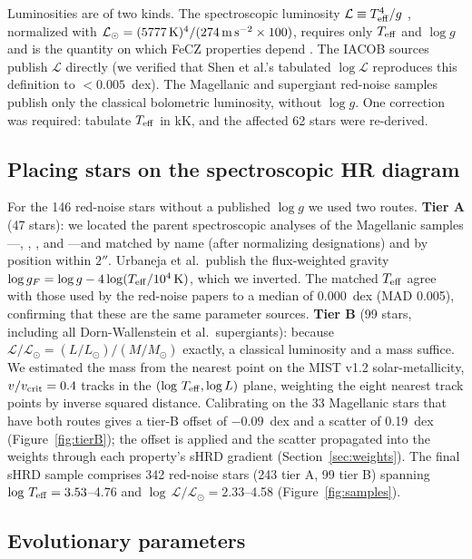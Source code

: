 \documentclass[twocolumn]{aastex631}
\newcommand{\teff}{T_{\rm eff}}
\renewcommand{\ell}{\mathcal{L}}
\newcommand{\lgL}{\log\,\ell/\ell_\odot}
\newcommand{\lgT}{\log\,\teff}
\begin{document}
Luminosities are of two kinds. The spectroscopic luminosity $\ell\equiv\teff^4/g$ \citep{langer2014}, normalized with $\ell_\odot=(5777\,{\rm K})^4/(274\,{\rm m\,s^{-2}}\times100)$, requires only $\teff$ and $\log g$ and is the quantity on which FeCZ properties depend \citep{cantiello2021}. The IACOB sources publish $\ell$ directly (we verified that Shen et al.'s tabulated $\log\ell$ reproduces this definition to $<0.005$~dex). The Magellanic and supergiant red-noise samples publish only the classical bolometric luminosity, without $\log g$. One correction was required: \citet{holgado2018} tabulate $\teff$ in kK, and the affected 62 stars were re-derived.

\subsection{Placing stars on the spectroscopic HR diagram}\label{sec:shrd}

For the 146 red-noise stars without a published $\log g$ we used two routes. \textbf{Tier A} (47 stars): we located the parent spectroscopic analyses of the Magellanic samples---\citet{bestenlehner2025}, \citet{vink2023}, \citet{urbaneja2017}, and \citet{mcevoy2015}---and matched by name (after normalizing designations) and by position within $2''$. Urbaneja et al.\ publish the flux-weighted gravity $\log g_F=\log g-4\log(\teff/10^4\,{\rm K})$, which we inverted. The matched $\teff$ agree with those used by the red-noise papers to a median of 0.000~dex (MAD 0.005), confirming that these are the same parameter sources. \textbf{Tier B} (99 stars, including all Dorn-Wallenstein et al.\ supergiants): because $\ell/\ell_\odot=(L/L_\odot)/(M/M_\odot)$ exactly, a classical luminosity and a mass suffice. We estimated the mass from the nearest point on the MIST v1.2 solar-metallicity, $v/v_{\rm crit}=0.4$ tracks \citep{choi2016,dotter2016} in the $(\lgT,\log L)$ plane, weighting the eight nearest track points by inverse squared distance. Calibrating on the 33 Magellanic stars that have both routes gives a tier-B offset of $-0.09$~dex and a scatter of 0.19~dex (Figure~\ref{fig:tierB}); the offset is applied and the scatter propagated into the weights through each property's sHRD gradient (Section~\ref{sec:weights}). The final sHRD sample comprises 342 red-noise stars (243 tier A, 99 tier B) spanning $\lgT=3.53$--4.76 and $\lgL=2.33$--4.58 (Figure~\ref{fig:samples}).

\subsection{Evolutionary parameters}\label{sec:evol}
\end{document}
